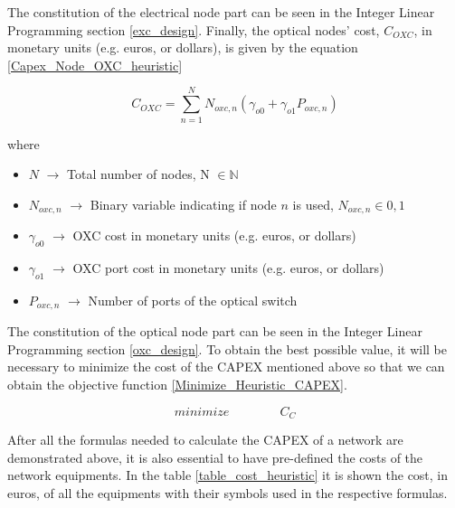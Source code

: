 The constitution of the electrical node part can be seen in the Integer Linear Programming section \ref{exc_design}. Finally, the optical nodes' cost, $C_{OXC}$, in monetary units (e.g. euros, or dollars), is given by the equation \ref{Capex_Node_OXC_heuristic}

\begin{equation}
C_{OXC} = \sum_{n=1}^{N} N_{oxc,n} \left( \gamma_{o0} + \gamma_{o1} P_{oxc,n} \right)
\label{Capex_Node_OXC_heuristic}
\end{equation}

\noindent
where

\begin{itemize}
\item{$N$				$\rightarrow$	Total number of nodes, N $\in \mathbb{N}$}
\item{$N_{oxc,n}$		$\rightarrow$	Binary variable indicating if node $n$ is used, $N_{oxc,n} \in {0, 1}$}
\item{$\gamma_{o0}$ 	$\rightarrow$	OXC cost in monetary units (e.g. euros, or dollars)}
\item{$\gamma_{o1}$ 	$\rightarrow$	OXC port cost in monetary units (e.g. euros, or dollars) }
\item{$P_{oxc,n}$	    $\rightarrow$	Number of ports of the optical switch}
\end{itemize}

The constitution of the optical node part can be seen in the Integer Linear Programming section \ref{oxc_design}. To obtain the best possible value, it will be necessary to minimize the cost of the CAPEX mentioned above so that we can obtain the objective function \ref{Minimize_Heuristic_CAPEX}.

\begin{equation}
minimize \qquad \qquad C_C
\label{Minimize_Heuristic_CAPEX}
\end{equation}

After all the formulas needed to calculate the CAPEX of a network are demonstrated above, it is also essential to have pre-defined the costs of the network equipments. In the table \ref{table_cost_heuristic} it is shown the cost, in euros, of all the equipments with their symbols used in the respective formulas.\\

